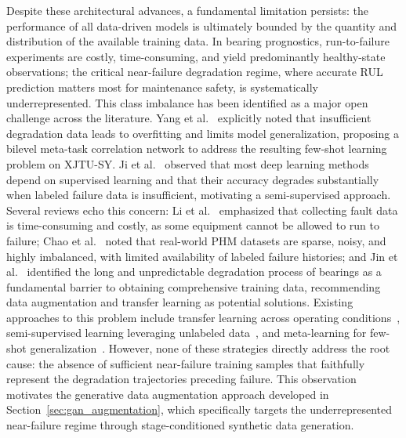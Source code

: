 \documentclass[review]{elsarticle}
\begin{document}
Despite these architectural advances, a fundamental limitation
persists: the performance of all data-driven models is ultimately
bounded by the quantity and distribution of the available training
data. In bearing prognostics, run-to-failure experiments are costly,
time-consuming, and yield predominantly healthy-state observations;
the critical near-failure degradation regime, where accurate RUL
prediction matters most for maintenance safety, is systematically
underrepresented. This class imbalance has been identified as a
major open challenge across the literature.
Yang et al.~\cite{YANG2026114614} explicitly noted that insufficient
degradation data leads to overfitting and limits model generalization,
proposing a bilevel meta-task correlation network to address the
resulting few-shot learning problem on XJTU-SY.
Ji et al.~\cite{ji_semi-supervised_2026} observed that most deep
learning methods depend on supervised learning and that their accuracy
degrades substantially when labeled failure data is insufficient,
motivating a semi-supervised approach. Several reviews echo this
concern: Li et al.~\cite{s25144481} emphasized that collecting fault
data is time-consuming and costly, as some equipment cannot be allowed
to run to failure; Chao et al.~\cite{machines14040412} noted that
real-world PHM datasets are sparse, noisy, and highly imbalanced, with
limited availability of labeled failure histories; and
Jin et al.~\cite{jin_graph_2025} identified the long and
unpredictable degradation process of bearings as a fundamental barrier
to obtaining comprehensive training data, recommending data
augmentation and transfer learning as potential solutions.
Existing approaches to this problem include transfer learning across
operating conditions~\cite{DENG2026112193, YONGXING2026104313},
semi-supervised learning leveraging unlabeled
data~\cite{ji_semi-supervised_2026}, and meta-learning for few-shot
generalization~\cite{YANG2026114614}. However, none of these
strategies directly address the root cause: the absence of
sufficient near-failure training samples that faithfully represent
the degradation trajectories preceding failure. This observation
motivates the generative data augmentation approach developed in
Section~\ref{sec:gan_augmentation}, which specifically targets the
underrepresented near-failure regime through stage-conditioned
synthetic data generation.\\
\end{document}

